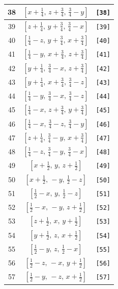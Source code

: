 \documentclass[fleqn,8pt]{jsarticle}
\begin{document}
\begin{longtable}{ccc}
38 & $\left[ x + \frac{1}{4},\, z + \frac{3}{4},\, \frac{3}{4} - y \right]$ & {\tt [38]} \\ \hline
39 & $\left[ z + \frac{1}{4},\, y + \frac{3}{4},\, \frac{3}{4} - x \right]$ & {\tt [39]} \\ \hline
40 & $\left[ \frac{1}{4} - z,\, y + \frac{3}{4},\, x + \frac{3}{4} \right]$ & {\tt [40]} \\ \hline
41 & $\left[ \frac{1}{4} - y,\, x + \frac{3}{4},\, z + \frac{3}{4} \right]$ & {\tt [41]} \\ \hline
42 & $\left[ y + \frac{1}{4},\, \frac{3}{4} - x,\, z + \frac{3}{4} \right]$ & {\tt [42]} \\ \hline
43 & $\left[ y + \frac{1}{4},\, x + \frac{3}{4},\, \frac{3}{4} - z \right]$ & {\tt [43]} \\ \hline
44 & $\left[ \frac{1}{4} - y,\, \frac{3}{4} - x,\, \frac{3}{4} - z \right]$ & {\tt [44]} \\ \hline
45 & $\left[ \frac{1}{4} - x,\, z + \frac{3}{4},\, y + \frac{3}{4} \right]$ & {\tt [45]} \\ \hline
46 & $\left[ \frac{1}{4} - x,\, \frac{3}{4} - z,\, \frac{3}{4} - y \right]$ & {\tt [46]} \\ \hline
47 & $\left[ z + \frac{1}{4},\, \frac{3}{4} - y,\, x + \frac{3}{4} \right]$ & {\tt [47]} \\ \hline
48 & $\left[ \frac{1}{4} - z,\, \frac{3}{4} - y,\, \frac{3}{4} - x \right]$ & {\tt [48]} \\ \hline
49 & $\left[ x + \frac{1}{2},\, y,\, z + \frac{1}{2} \right]$ & {\tt [49]} \\ \hline
50 & $\left[ x + \frac{1}{2},\, - y,\, \frac{1}{2} - z \right]$ & {\tt [50]} \\ \hline
51 & $\left[ \frac{1}{2} - x,\, y,\, \frac{1}{2} - z \right]$ & {\tt [51]} \\ \hline
52 & $\left[ \frac{1}{2} - x,\, - y,\, z + \frac{1}{2} \right]$ & {\tt [52]} \\ \hline
53 & $\left[ z + \frac{1}{2},\, x,\, y + \frac{1}{2} \right]$ & {\tt [53]} \\ \hline
54 & $\left[ y + \frac{1}{2},\, z,\, x + \frac{1}{2} \right]$ & {\tt [54]} \\ \hline
55 & $\left[ \frac{1}{2} - y,\, z,\, \frac{1}{2} - x \right]$ & {\tt [55]} \\ \hline
56 & $\left[ \frac{1}{2} - z,\, - x,\, y + \frac{1}{2} \right]$ & {\tt [56]} \\ \hline
57 & $\left[ \frac{1}{2} - y,\, - z,\, x + \frac{1}{2} \right]$ & {\tt [57]} \\ \hline

\end{longtable}
\end{document}
